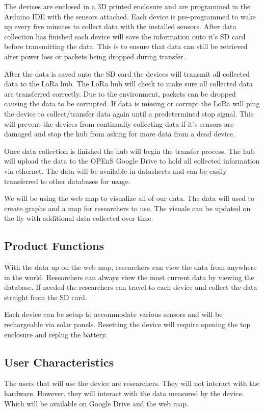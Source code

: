 \documentclass[onecolumn, draftclsnofoot,10pt, compsoc]{IEEEtran}
\begin{document}
The devices are enclosed in a 3D printed enclosure and are programmed in the Arduino IDE with the sensors attached.  Each device is pre-programmed to wake up every five minutes to collect data with the installed sensors.  After data collection has finished each device will save the information onto it’s SD card before transmitting the data.  This is to ensure that data can still be retrieved after power loss or packets being dropped during transfer.
\newline

After the data is saved onto the SD card the devices will transmit all collected data to the LoRa hub.  The LoRa hub will check to make sure all collected data are transferred correctly.  Due to the environment, packets can be dropped causing the data to be corrupted.  If data is missing or corrupt the LoRa will ping the device to collect/transfer data again until a predetermined stop signal.  This will prevent the devices from continually collecting data if it’s sensors are damaged and stop the hub from asking for more data from a dead device.
\newline

Once data collection is finished the hub will begin the transfer process.  The hub will upload the data to the OPEnS Google Drive to hold all collected information via ethernet.  The data will be available in datasheets and can be easily transferred to other databases for usage.
\newline

We will be using the web map to visualize all of our data.  The data will used to create graphs and a map for researchers to use.  The visuals can be updated on the fly with additional data collected over time.
\subsection{Product Functions}
With the data up on the web map, researchers can view the data from anywhere in the world.  Researchers can always view the most current data by viewing the database.  If needed the researchers can travel to each device and collect the data straight from the SD card.


Each device can be setup to accommodate various sensors and will be rechargeable via solar panels. Resetting the device will require opening the top enclosure and replug the battery.
\subsection{User Characteristics}
The users that will use the device are researchers. They will not interact with the hardware. However, they will interact with the data measured by the device. Which will be available on Google Drive and the web map.
\end{document}
